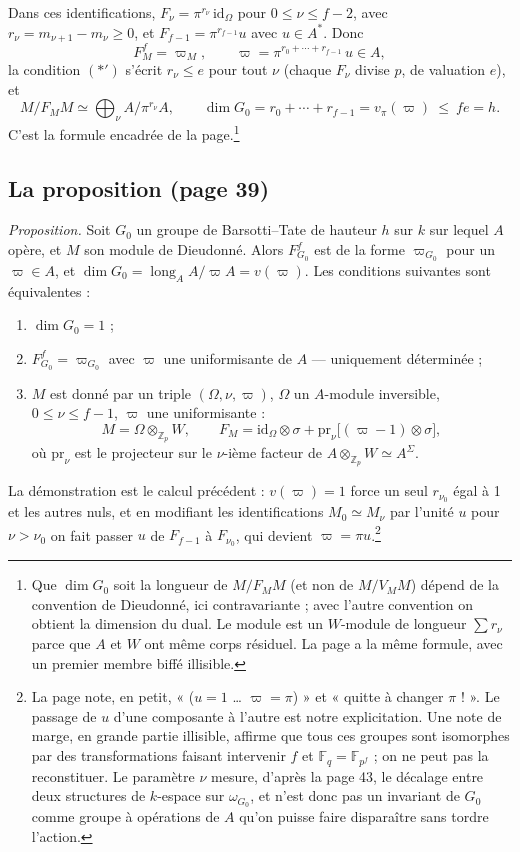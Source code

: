 \documentclass[11pt,a4paper]{article}
\begin{document}
Dans ces identifications, $F_{\nu} = \pi^{r_{\nu}}\,\mathrm{id}_{\Omega}$
pour $0 \le \nu \le f-2$, avec $r_{\nu} = m_{\nu+1} - m_{\nu} \ge 0$, et
$F_{f-1} = \pi^{r_{f-1}}u$ avec $u \in A^{*}$. Donc
\[
F_{M}^{f} = \varpi_{M}, \qquad \varpi = \pi^{r_{0} + \cdots + r_{f-1}}\,u \in A,
\]
la condition $(*')$ s'écrit $r_{\nu} \le e$ pour tout $\nu$ (chaque
$F_{\nu}$ divise $p$, de valuation $e$), et
\[
M/F_{M}M \simeq \bigoplus_{\nu} A/\pi^{r_{\nu}}A, \qquad
\dim G_{0} = r_{0} + \cdots + r_{f-1} = v_{\pi}(\varpi) \ \le\ fe = h .
\]
C'est la formule encadrée de la page.\footnote{Que $\dim G_{0}$ soit la longueur de $M/F_{M}M$ (et non de
$M/V_{M}M$) dépend de la convention de Dieudonné, ici contravariante ; avec
l'autre convention on obtient la dimension du dual. Le module est un
$W$-module de longueur $\sum r_{\nu}$ parce que $A$ et $W$ ont même corps
résiduel. La page a la même formule, avec un premier membre biffé
illisible.}

\subsection*{La proposition (page 39)}

\emph{Proposition.} Soit $G_{0}$ un groupe de Barsotti--Tate de hauteur $h$
sur $k$ sur lequel $A$ opère, et $M$ son module de Dieudonné. Alors
$F_{G_{0}}^{f}$ est de la forme $\varpi_{G_{0}}$ pour un $\varpi \in A$, et
$\dim G_{0} = \operatorname{long}_{A} A/\varpi A = v(\varpi)$. Les conditions
suivantes sont équivalentes :
\begin{enumerate}
\item[(i)] $\dim G_{0} = 1$ ;
\item[(ii)] $F_{G_{0}}^{f} = \varpi_{G_{0}}$ avec $\varpi$ une uniformisante
de $A$ — uniquement déterminée ;
\item[(iii)] $M$ est donné par un triple $(\Omega, \nu, \varpi)$, $\Omega$
un $A$-module inversible, $0 \le \nu \le f-1$, $\varpi$ une uniformisante :
\[
M = \Omega \otimes_{\mathbb{Z}_{p}} W, \qquad
F_{M} = \mathrm{id}_{\Omega} \otimes \sigma + \mathrm{pr}_{\nu}\bigl[(\varpi - 1)
\otimes \sigma\bigr],
\]
où $\mathrm{pr}_{\nu}$ est le projecteur sur le $\nu$-ième facteur de
$A \otimes_{\mathbb{Z}_{p}} W \simeq A^{\Sigma}$.
\end{enumerate}

La démonstration est le calcul précédent : $v(\varpi) = 1$ force un seul
$r_{\nu_{0}}$ égal à 1 et les autres nuls, et en modifiant les
identifications $M_{0} \simeq M_{\nu}$ par l'unité $u$ pour $\nu > \nu_{0}$
on fait passer $u$ de $F_{f-1}$ à $F_{\nu_{0}}$, qui devient $\varpi =
\pi u$.\footnote{La page note, en petit, « ($u = 1$ \ldots{} $\varpi = \pi$) »
et « quitte à changer $\pi$ ! ». Le passage de $u$ d'une composante à
l'autre est notre explicitation. Une note de marge, en grande partie
illisible, affirme que tous ces groupes sont isomorphes par des
transformations faisant intervenir $f$ et $\mathbb{F}_{q} = \mathbb{F}_{p^{f}}$ ;
on ne peut pas la reconstituer. Le paramètre $\nu$ mesure, d'après la page
43, le décalage entre deux structures de $k$-espace sur $\omega_{G_{0}}$, et
n'est donc pas un invariant de $G_{0}$ comme groupe à opérations de $A$
qu'on puisse faire disparaître sans tordre l'action.}
\end{document}
